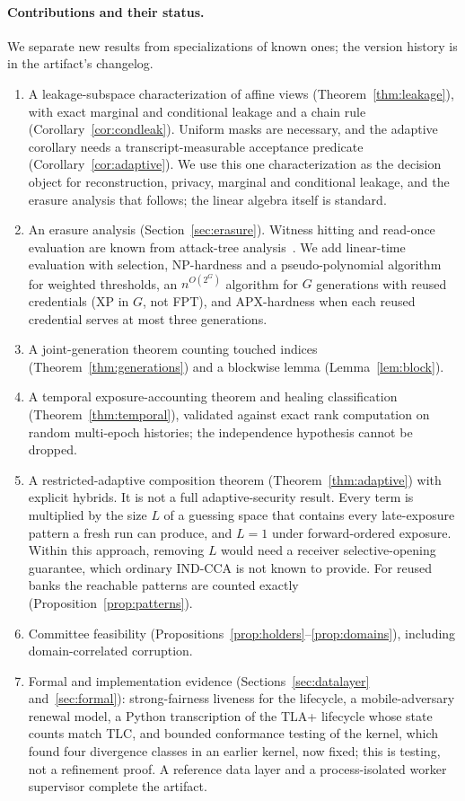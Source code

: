 \documentclass[pdflatex,sn-mathphys-num,twocolumn]{sn-jnl}
\theoremstyle{plain}
\theoremstyle{definition}
\begin{document}
\paragraph{Contributions and their status.}
We separate new results from specializations of known ones; the version history is in the artifact's changelog.
\begin{enumerate}
\item A leakage-subspace characterization of affine views (Theorem~\ref{thm:leakage}), with exact marginal and conditional leakage and a chain rule (Corollary~\ref{cor:condleak}). Uniform masks are necessary, and the adaptive corollary needs a transcript-measurable acceptance predicate (Corollary~\ref{cor:adaptive}). We use this one characterization as the decision object for reconstruction, privacy, marginal and conditional leakage, and the erasure analysis that follows; the linear algebra itself is standard.
\item An erasure analysis (Section~\ref{sec:erasure}). Witness hitting and read-once evaluation are known from attack-tree analysis~\cite{mauw2005,lopuhaa2022}. We add linear-time evaluation with selection, NP-hardness and a pseudo-polynomial algorithm for weighted thresholds, an $n^{O(2^G)}$ algorithm for $G$ generations with reused credentials (XP in $G$, not FPT), and APX-hardness when each reused credential serves at most three generations.
\item A joint-generation theorem counting touched indices (Theorem~\ref{thm:generations}) and a blockwise lemma (Lemma~\ref{lem:block}).
\item A temporal exposure-accounting theorem and healing classification (Theorem~\ref{thm:temporal}), validated against exact rank computation on random multi-epoch histories; the independence hypothesis cannot be dropped.
\item A restricted-adaptive composition theorem (Theorem~\ref{thm:adaptive}) with explicit hybrids. It is not a full adaptive-security result. Every term is multiplied by the size $L$ of a guessing space that contains every late-exposure pattern a fresh run can produce, and $L=1$ under forward-ordered exposure. Within this approach, removing $L$ would need a receiver selective-opening guarantee, which ordinary IND-CCA is not known to provide. For reused banks the reachable patterns are counted exactly (Proposition~\ref{prop:patterns}).
\item Committee feasibility (Propositions~\ref{prop:holders}--\ref{prop:domains}), including domain-correlated corruption.
\item Formal and implementation evidence (Sections~\ref{sec:datalayer} and~\ref{sec:formal}): strong-fairness liveness for the lifecycle, a mobile-adversary renewal model, a Python transcription of the TLA+ lifecycle whose state counts match TLC, and bounded conformance testing of the kernel, which found four divergence classes in an earlier kernel, now fixed; this is testing, not a refinement proof. A reference data layer and a process-isolated worker supervisor complete the artifact.
\end{enumerate}
\end{document}
